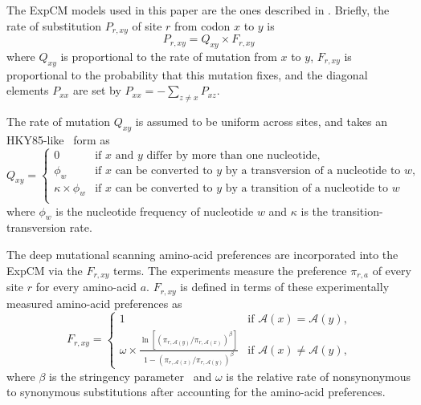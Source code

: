 \documentclass[11pt]{article}
\begin{document}
The ExpCM models used in this paper are the ones described in \citet{bloom2017identification}. 
Briefly, the rate of substitution $P_{r,xy}$ of site $r$ from codon $x$ to $y$ is 
\begin{equation}
\label{eq:ExpCM}
P_{r,xy} = Q_{xy} \times F_{r,xy}
\end{equation}
where $Q_{xy}$ is proportional to the rate of mutation from $x$ to $y$, $F_{r,xy}$ is proportional to the probability that this mutation fixes, and the diagonal elements $P_{xx}$ are set by $P_{xx} = -\sum_{z \ne x} P_{xz}$. 

The rate of mutation $Q_{xy}$ is assumed to be uniform across sites, and takes an HKY85-like~\citep{hasegawa1985dating} form as 
\begin{equation}
\label{eq:Qxy}
   Q_{xy} = \begin{cases}
            0 & \mbox{if $x$ and $y$ differ by more than one nucleotide,} \\
            \phi_w & \mbox{if $x$ can be converted to $y$ by a transversion of a nucleotide to $w$,} \\
            \kappa \times \phi_w & \mbox{if $x$ can be converted to $y$ by a transition of a nucleotide to $w$} \\
            \end{cases}
\end{equation}
where $\phi_w$ is the nucleotide frequency of nucleotide $w$ and $\kappa$ is the transition-transversion rate.


The deep mutational scanning amino-acid preferences are incorporated into the ExpCM via the $F_{r,xy}$ terms.
The experiments measure the preference $\pi_{r,a}$ of every site $r$ for every amino-acid $a$.
$F_{r,xy}$ is defined in terms of these experimentally measured amino-acid preferences as
\begin{equation}
\label{eq:Frxy}
F_{r,xy} = 
\begin{cases}
   1 & \mbox{if $\mathcal{A}\left(x\right) = \mathcal{A}\left(y\right)$,} \\
   \omega \times \frac{\ln\left[\left(\pi_{r,\mathcal{A}\left(y\right)} / \pi_{r,\mathcal{A}\left(x\right)}\right)^{\beta}\right]}{1 - \left(\pi_{r,\mathcal{A}\left(x\right)} / \pi_{r,\mathcal{A}\left(y\right)}\right)^{\beta}} & \mbox{if $\mathcal{A}\left(x\right) \ne \mathcal{A}\left(y\right)$,}
   \end{cases}
\end{equation}
where $\beta$ is the stringency parameter~\citep{bloom2014informed,hilton2017phydms} and $\omega$ is the relative rate of nonsynonymous to synonymous substitutions after accounting for the amino-acid preferences.
\end{document}
